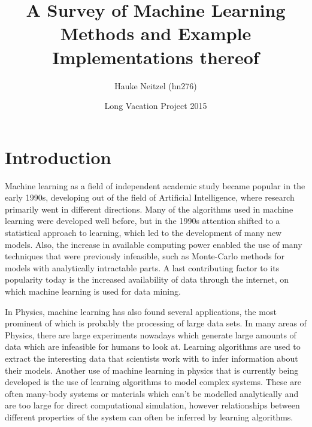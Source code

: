 \documentclass[a4paper]{article}
\title{A Survey of Machine Learning Methods and Example Implementations thereof}
\author{Hauke Neitzel (hn276)}
\date{Long Vacation Project 2015}
\begin{document}
\maketitle


\section{Introduction}
Machine learning as a field of independent academic study became popular in the early 1990s, developing out of the field of Artificial Intelligence, where research primarily went in different directions. Many of the algorithms used in machine learning were developed well before, but in the 1990s attention shifted to a statistical approach to learning, which led to the development of many new models. Also, the increase in available computing power enabled the use of many techniques that were previously infeasible, such as Monte-Carlo methods for models with analytically intractable parts. A last contributing factor to its popularity today is the increased availability of data through the internet, on which machine learning is used for data mining.

In Physics, machine learning has also found several applications, the most prominent of which is probably the processing of large data sets. In many areas of Physics, there are large experiments nowadays which generate large amounts of data which are infeasible for humans to look at. Learning algorithms are used to extract the interesting data that scientists work with to infer information about their models. Another use of machine learning in physics that is currently being developed is the use of learning algorithms to model complex systems. These are often many-body systems or materials which can't be modelled analytically and are too large for direct computational simulation, however relationships between different properties of the system can often be inferred by learning algorithms.
\end{document}

